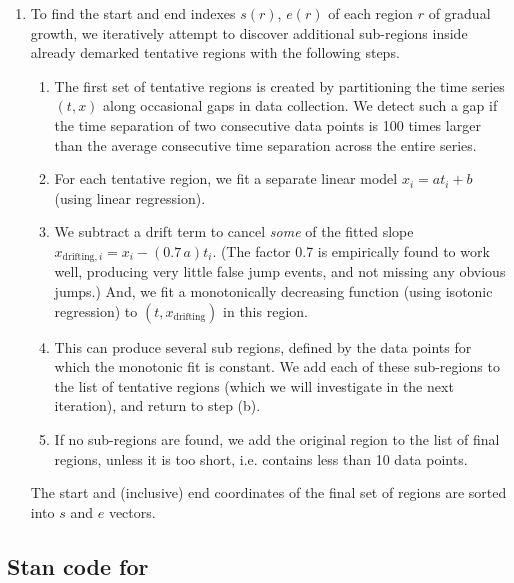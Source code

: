\begin{enumerate}
	\item To find the start and end indexes $s(r)$, $e(r)$ of each region $r$ of gradual growth, we iteratively attempt to discover additional sub-regions inside already demarked tentative regions with the following steps.
	\begin{enumerate}
		\item The first set of tentative regions is created by partitioning the time series $(t, x)$ along occasional gaps in data collection. We detect such a gap if the time separation of two consecutive data points is 100 times larger than the average consecutive time separation across the entire series.
		\item For each tentative region, we fit a separate linear model $x_i = at_i + b$ (using linear regression).
		\item We subtract a drift term to cancel \emph{some} of the fitted slope $x_{\text{drifting},i} = x_i - (0.7\, a)t_i$. (The factor 0.7 is empirically found to work well, producing very little false jump events, and not missing any obvious jumps.) And, we fit a monotonically decreasing function (using isotonic regression) to $(t, x_\text{drifting})$ in this region.
		\item This can produce several sub regions, defined by the data points for which the monotonic fit is constant. We add each of these sub-regions to the list of tentative regions (which we will investigate in the next iteration), and return to step (b).
		\item If no sub-regions are found, we add the original region to the list of final regions, unless it is too short, i.e. contains less than 10 data points.
	\end{enumerate}
	The start and (inclusive) end coordinates of the final set of regions are sorted into $s$ and $e$ vectors.

\end{enumerate}



\subsection{Stan code for }
